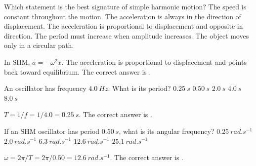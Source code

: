 \documentclass[full,print,11pt,a4paper]{physicsquiz}
\begin{document}
\begin{quizbank}
  \begin{quizquestion}[
    id=ow-shm-001,
    topic=simple-harmonic-motion,
    difficulty=foundation,
    marks=1,
    correct=C,
    tags={shm,definition},
    outcome={Recognize the defining acceleration relation for SHM}
  ]
    Which statement is the best signature of simple harmonic motion?
    \choices
      {The speed is constant throughout the motion.}
      {The acceleration is always in the direction of displacement.}
      {The acceleration is proportional to displacement and opposite in direction.}
      {The period must increase when amplitude increases.}
      {The object moves only in a circular path.}
  \end{quizquestion}
  \begin{quizsolution}
    In SHM, \(a=-\omega^2x\). The acceleration is proportional to displacement
    and points back toward equilibrium. The correct answer is \quizcorrectletter.
  \end{quizsolution}

  \begin{quizquestion}[
    id=ow-shm-002,
    topic=simple-harmonic-motion,
    difficulty=foundation,
    marks=1,
    correct=A,
    tags={period,frequency},
    outcome={Relate period and frequency}
  ]
    An oscillator has frequency \(\SI{4.0}{Hz}\). What is its period?
    \choices
      {\(\SI{0.25}{s}\)}
      {\(\SI{0.50}{s}\)}
      {\(\SI{2.0}{s}\)}
      {\(\SI{4.0}{s}\)}
      {\(\SI{8.0}{s}\)}
  \end{quizquestion}
  \begin{quizsolution}
    \(T=1/f=1/4.0=\SI{0.25}{s}\). The correct answer is
    \quizcorrectletter.
  \end{quizsolution}

  \begin{quizquestion}[
    id=ow-shm-003,
    topic=simple-harmonic-motion,
    difficulty=applied,
    marks=1,
    correct=D,
    tags={angular-frequency,calculation},
    outcome={Compute angular frequency from period}
  ]
    If an SHM oscillator has period \(\SI{0.50}{s}\), what is its angular
    frequency?
    \choices
      {\(\SI{0.25}{rad.s^{-1}}\)}
      {\(\SI{2.0}{rad.s^{-1}}\)}
      {\(\SI{6.3}{rad.s^{-1}}\)}
      {\(\SI{12.6}{rad.s^{-1}}\)}
      {\(\SI{25.1}{rad.s^{-1}}\)}
  \end{quizquestion}
  \begin{quizsolution}
    \(\omega=2\pi/T=2\pi/0.50=\SI{12.6}{rad.s^{-1}}\). The correct answer is
    \quizcorrectletter.
  \end{quizsolution}


\end{quizbank}
\end{document}

